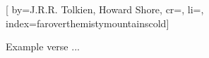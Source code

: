 
[%
    by={J.R.R. Tolkien, Howard Shore},
    cr={},
    li={},
    index={faroverthemistymountainscold}]


    \label{faroverthemistymountainscold}

    \beginverse
        Example verse ...
    \endverse
\endsong
